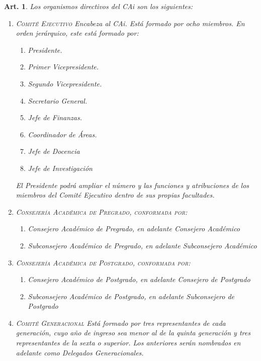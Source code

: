 \documentclass[letterpaper,11pt]{article}
\theoremstyle{plain}
\newtheorem{art}{Art.} %
\begin{document}
		\newpage

		\begin{art}\label{organismosCAi}
			Los organismos directivos del CAi son los siguientes:
			\begin{enumerate}
				\item \label{jerarquia} \textsc{Comité Ejecutivo} Encabeza al CAi. Está formado por ocho miembros. En orden jerárquico, este está formado por:
					\begin{enumerate}
						\item Presidente.
						\item Primer Vicepresidente.
						\item Segundo Vicepresidente.
						\item Secretario General.
						\item Jefe de Finanzas.
						\item Coordinador de Áreas.
						\item Jefe de Docencia
						\item Jefe de Investigación
					\end{enumerate}
				El Presidente podrá ampliar el número y las funciones y atribuciones de los miembros del Comité Ejecutivo dentro de sus propias facultades.

				\item \textsc{Consejería Académica de Pregrado, conformada por}:
					\begin{enumerate}
						\item Consejero Académico de Pregrado, en adelante Consejero Académico
						\item Subconsejero Académico de Pregrado, en adelante Subconsejero Académico
					\end{enumerate}

				\item \textsc{Consejería Académica de Postgrado, conformada por}:
					\begin{enumerate}
						\item Consejero Académico de Postgrado, en adelante Consejero de Postgrado
						\item Subconsejero Académico de Postgrado, en adelante Subconsejero de Postgrado
					\end{enumerate}

				\item \textsc{Comité Generacional} Está formado por tres representantes de cada generación, cuyo año de ingreso sea menor al de la quinta generación y tres representantes de la sexta o superior. Los anteriores serán nombrados en adelante como Delegados Generacionales.


\end{enumerate}
\end{art}
\end{document}
